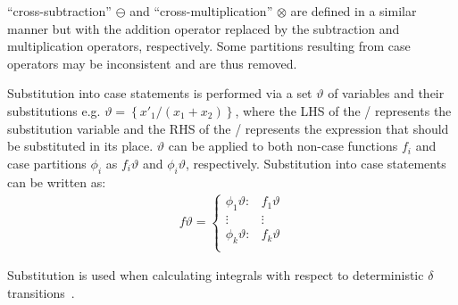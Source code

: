 ``cross-subtraction'' {\footnotesize$\ominus$} and ``cross-multiplication'' {\footnotesize$\otimes$} are defined in a similar manner but with the addition operator replaced by the subtraction and multiplication operators, respectively. Some partitions resulting from case operators may be inconsistent and are thus removed.

Substitution into case statements is performed via a set {\footnotesize$\vartheta$} of variables and their substitutions e.g. {\footnotesize$\vartheta = \left\{ x'_1/(x_1 + x_2) \right\}$}, where the LHS of the / represents the substitution variable and the RHS of the / represents the expression that should be substituted in its place. {\footnotesize$\vartheta$} can be applied to both non-case functions {\footnotesize$f_i$} and case partitions {\footnotesize$\phi_i$} as {\footnotesize$f_i\vartheta$} and {\footnotesize$\phi_i\vartheta$}, respectively. Substitution into case statements can be written as:
{\footnotesize 
    \abovedisplayskip=5pt
    \belowdisplayskip=0pt
    \begin{align*}
        f\vartheta = 
        \begin{cases}
            \phi_1\vartheta: & f_1\vartheta \\ 
            \vdots & \vdots\\ 
            \phi_k\vartheta: & f_k\vartheta \\ 
        \end{cases}
    \end{align*}
}%

Substitution is used when calculating integrals with respect to deterministic {\footnotesize$\delta$} transitions~\parencite{Sanner_UAI_2011}.

